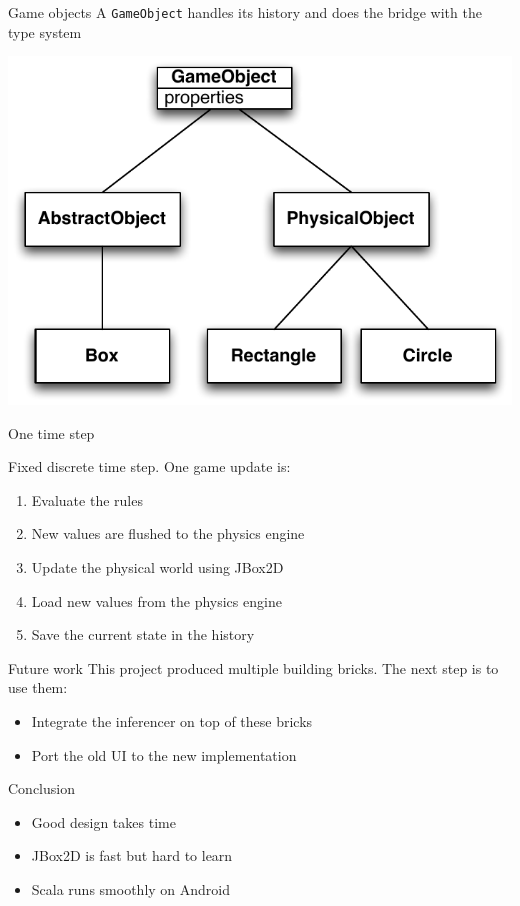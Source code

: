 \documentclass[12pt]{beamer}
\begin{document}
\begin{frame}{Game objects}
A \texttt{GameObject} handles its history and does the bridge with the type system
 
\begin{center}
\includegraphics[scale=0.65]{images/objects}
\end{center}

\end{frame}

\begin{frame}{One time step}

Fixed discrete time step. One game update is:
\vspace*{2mm}
\begin{enumerate}
\item Evaluate the rules
\item New values are flushed to the physics engine
\item Update the physical world using JBox2D
\item Load new values from the physics engine
\item Save the current state in the history
\end{enumerate}

\end{frame}

\begin{frame}{Future work}
This project produced multiple building bricks. The next step is to use them:
\begin{itemize}
\item Integrate the inferencer on top of these bricks
\item Port the old UI to the new implementation
\end{itemize}
\end{frame}


\begin{frame}{Conclusion}
\begin{itemize}
\item Good design takes time
\item JBox2D is fast but hard to learn
\item Scala runs smoothly on Android 
\end{itemize}
\end{frame}
\end{document}
